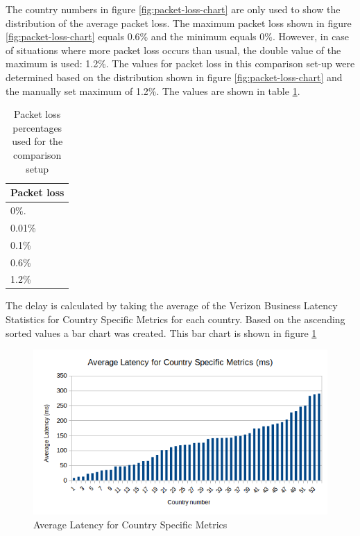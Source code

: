 \documentclass{article}
\begin{document}
The country numbers in figure \ref{fig:packet-loss-chart} are only used to show the distribution of the average packet loss. The maximum packet loss shown in figure \ref{fig:packet-loss-chart} equals 0.6\% and the minimum equals 0\%. However, in case of situations where more packet loss occurs than usual, the double value of the maximum is used: 1.2\%. The values for packet loss in this comparison set-up were determined based on the distribution shown in figure \ref{fig:packet-loss-chart} and the manually set maximum of 1.2\%. The values are shown in table \ref{table:test-packetloss}.

\begin{table}[H]
	\centering
	\caption{Packet loss percentages used for the comparison setup}
	\begin{tabular}[H]{ | l |}
	\hline
	\textbf{Packet loss} \\
	\hline 0\%. \\
	\hline 0.01\% \\
	\hline 0.1\% \\
	\hline 0.6\% \\
	\hline 1.2\% \\
	\hline
	\end{tabular}
	\label{table:test-packetloss}
\end{table}

The delay is calculated by taking the average of the Verizon Business Latency Statistics for Country Specific Metrics for each country. Based on the ascending sorted values a bar chart was created. This bar chart is shown in figure \ref{fig:verizon-delay-chart}

\begin{figure}[H]
	\centering
		\includegraphics[scale=0.7]{figs/verizon-delay.png}
		\caption{Average Latency for Country Specific Metrics}
	\label{fig:verizon-delay-chart}
\end{figure}
\end{document}
